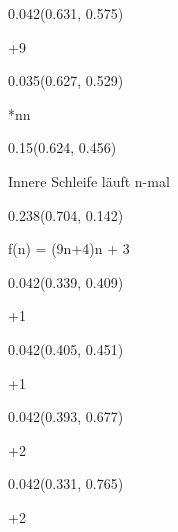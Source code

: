 \documentclass[aspectratio=169]{beamer}
\begin{document}
\begin{frame}[fragile]
\begin{textblock}{0.042}(0.631, 0.575)
  \begin{minipage}[t][0.044\paperheight]{\linewidth}
    +9
  \end{minipage}
\end{textblock}

\begin{textblock}{0.035}(0.627, 0.529)
  \begin{minipage}[t][0.054\paperheight]{\linewidth}
    *n\n*n
  \end{minipage}
\end{textblock}

\begin{textblock}{0.15}(0.624, 0.456)
  \begin{minipage}[t][0.094\paperheight]{\linewidth}
    Innere Schleife läuft n-mal
  \end{minipage}
\end{textblock}

\begin{textblock}{0.238}(0.704, 0.142)
  \begin{minipage}[t][0.168\paperheight]{\linewidth}
    f(n) = (9n+4)n + 3
  \end{minipage}
\end{textblock}

\begin{textblock}{0.042}(0.339, 0.409)
  \begin{minipage}[t][0.044\paperheight]{\linewidth}
    +1
  \end{minipage}
\end{textblock}

\begin{textblock}{0.042}(0.405, 0.451)
  \begin{minipage}[t][0.044\paperheight]{\linewidth}
    +1
  \end{minipage}
\end{textblock}

\begin{textblock}{0.042}(0.393, 0.677)
  \begin{minipage}[t][0.044\paperheight]{\linewidth}
    +2
  \end{minipage}
\end{textblock}

\begin{textblock}{0.042}(0.331, 0.765)
  \begin{minipage}[t][0.044\paperheight]{\linewidth}
    +2
  \end{minipage}
\end{textblock}


\end{frame}
\end{document}
